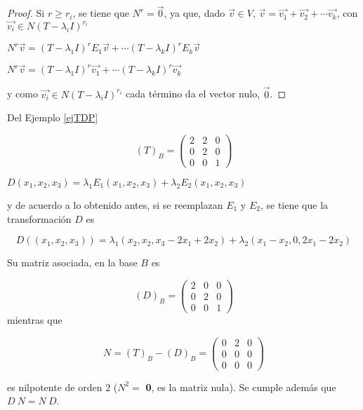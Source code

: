 \begin{corollary}
\begin{proof}
Si $r\ge r_i$, se tiene que $N^r= \Vec{0}$, ya que, 
dado $\Vec{v}  \in V$,  $\Vec{v}= \Vec{v_1} + \Vec{v_2}  + \cdots \Vec{v_k}$, con $\Vec{v_i} \in N(T- \lambda_i I)^{r_i}$

\bigskip

$N^r \Vec{v} = (T-\lambda_1 I)^r E_1 \Vec{v} + \cdots  (T-\lambda_k I)^r E_k \Vec{v}$ 

\bigskip

$N^r \Vec{v} = (T-\lambda_1 I)^r  \Vec{v_1} + \cdots  (T-\lambda_k I)^r  \Vec{v_k}$ 

\bigskip

\noindent
y como $\Vec{v_i} \in N(T- \lambda_i I)^{r_i}$ cada término  da el vector nulo, $\Vec{0}$.
\end{proof}
\end{corollary}


\bigskip

\begin{example}
 Del Ejemplo \ref{ejTDP} 

 $$(T)_B=\left(\begin{array}{ccc} 2 & 2 &  0 \\ 0 & 2 & 0
\\ 0 & 0 & 1
\end{array}
 \right)$$
\bigskip
 
\noindent
$D(x_1,x_2,x_3)= \lambda_1 E_1(x_1,x_2,x_3) + \lambda_2 E_2(x_1,x_2,x_3) $

\bigskip

\noindent
y de acuerdo a lo obtenido antes, si se reemplazan $E_1$ y $E_2$, se tiene que  la transformación $D$ es 

$$D((x_1,x_2,x_3))=  \lambda_1 (x_2,x_2, x_3-2x_1+2x_2)   + \lambda_2 (x_1-x_2,0, 2x_1-2x_2)$$

\bigskip
\noindent
Su matriz asociada, en la base $B$ es

\bigskip

$$(D)_B=\left(\begin{array}{ccc} 2 & 0 &  0 \\ 0 & 2 & 0
\\ 0 & 0 & 1
\end{array}
 \right)$$
\bigskip
\noindent
mientras que 

$$N= (T)_B-(D)_B =  \left(\begin{array}{ccc} 0 & 2 &  0 \\ 0 & 0 & 0
\\ 0 & 0 & 0
\end{array}
 \right)    $$ 
\bigskip
 
\noindent
es nilpotente de orden $2$ ($N^2= $  \textbf{0}, es la matriz nula). Se cumple además que $D ~N =N ~D$.



 
\end{example}



